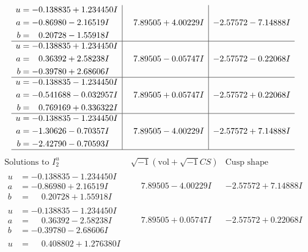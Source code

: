 \documentclass[1p]{elsarticle_modified}
\theoremstyle{definition}
\newcommand{\I}{\sqrt{-1}}
\begin{document}
$$\begin{array}{c|c|c}
\begin{aligned}
u &= -0.138835 + 1.234450 I \\
a &= -0.86980 - 2.16519 I \\
b &= \phantom{-}0.20728 - 1.55918 I\end{aligned}
 & \phantom{-}7.89505 + 4.00229 I & -2.57572 - 7.14888 I \\ \hline\begin{aligned}
u &= -0.138835 + 1.234450 I \\
a &= \phantom{-}0.36392 + 2.58238 I \\
b &= -0.39780 + 2.68606 I\end{aligned}
 & \phantom{-}7.89505 - 0.05747 I & -2.57572 - 0.22068 I \\ \hline\begin{aligned}
u &= -0.138835 - 1.234450 I \\
a &= -0.541688 - 0.032957 I \\
b &= \phantom{-}0.769169 + 0.336322 I\end{aligned}
 & \phantom{-}7.89505 + 0.05747 I & -2.57572 + 0.22068 I \\ \hline\begin{aligned}
u &= -0.138835 - 1.234450 I \\
a &= -1.30626 - 0.70357 I \\
b &= -2.42790 - 0.70593 I\end{aligned}
 & \phantom{-}7.89505 - 4.00229 I & -2.57572 + 7.14888 I\\
 \hline 
 \end{array}$$\newpage$$\begin{array}{c|c|c}  
\text{Solutions to }I^u_{2}& \I (\text{vol} + \sqrt{-1}CS) & \text{Cusp shape}\\
 \hline 
\begin{aligned}
u &= -0.138835 - 1.234450 I \\
a &= -0.86980 + 2.16519 I \\
b &= \phantom{-}0.20728 + 1.55918 I\end{aligned}
 & \phantom{-}7.89505 - 4.00229 I & -2.57572 + 7.14888 I \\ \hline\begin{aligned}
u &= -0.138835 - 1.234450 I \\
a &= \phantom{-}0.36392 - 2.58238 I \\
b &= -0.39780 - 2.68606 I\end{aligned}
 & \phantom{-}7.89505 + 0.05747 I & -2.57572 + 0.22068 I \\ \hline\begin{aligned}
u &= \phantom{-}0.408802 + 1.276380 I \\

\end{aligned}
\end{array}$$
\end{document}
